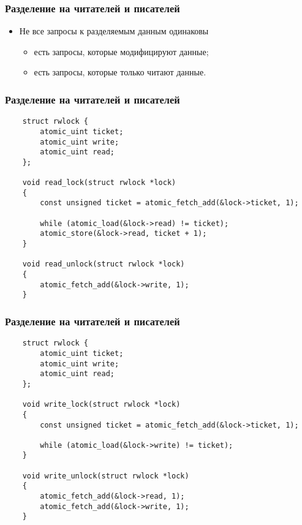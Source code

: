 \begin{frame}
\frametitle{Разделение на читателей и писателей}
\begin{itemize}
    \item<1->Не все запросы к разделяемым данным одинаковы
    \begin{itemize}
        \item<2->есть запросы, которые модифицируют данные;
        \item<3->есть запросы, которые только читают данные.
    \end{itemize}
\end{itemize}
\end{frame}

\begin{frame}[fragile]
\frametitle{Разделение на читателей и писателей}
\begin{lstlisting}
    struct rwlock {
        atomic_uint ticket;
        atomic_uint write;
        atomic_uint read;
    };

    void read_lock(struct rwlock *lock)
    {
        const unsigned ticket = atomic_fetch_add(&lock->ticket, 1);

        while (atomic_load(&lock->read) != ticket);
        atomic_store(&lock->read, ticket + 1);
    }

    void read_unlock(struct rwlock *lock)
    {
        atomic_fetch_add(&lock->write, 1);
    }
\end{lstlisting}
\end{frame}

\begin{frame}[fragile]
\frametitle{Разделение на читателей и писателей}
\begin{lstlisting}
    struct rwlock {
        atomic_uint ticket;
        atomic_uint write;
        atomic_uint read;
    };

    void write_lock(struct rwlock *lock)
    {
        const unsigned ticket = atomic_fetch_add(&lock->ticket, 1);

        while (atomic_load(&lock->write) != ticket);
    }

    void write_unlock(struct rwlock *lock)
    {
        atomic_fetch_add(&lock->read, 1);
        atomic_fetch_add(&lock->write, 1);
    }
\end{lstlisting}
\end{frame}
